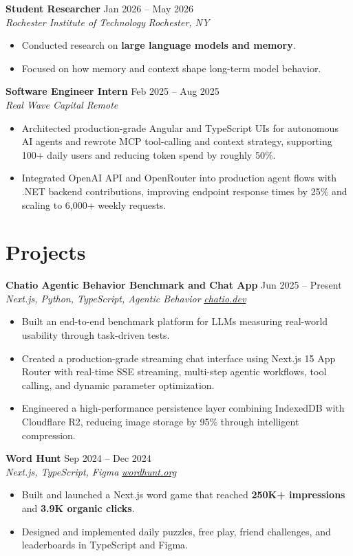 \documentclass[10pt,letterpaper]{article}
\newif\ifresumeFirstRole
\newcommand{\resumeRole}[4]{%
  \ifresumeFirstRole
    \global\resumeFirstRolefalse
  \else
    \vspace{0pt plus 1fill}%
  \fi
  \textbf{#1} \hfill #2\\
  \textit{#3} \hfill \textit{#4}
}
\begin{document}
\resumeRole{Student Researcher}{Jan 2026 -- May 2026}{Rochester Institute of Technology}{Rochester, NY}
\begin{itemize}
  \item Conducted research on \textbf{large language models and memory}.
  \item Focused on how memory and context shape long-term model behavior.
\end{itemize}

\resumeRole{Software Engineer Intern}{Feb 2025 -- Aug 2025}{Real Wave Capital}{Remote}
\begin{itemize}
  \item Architected production-grade Angular and TypeScript UIs for autonomous AI agents and rewrote MCP tool-calling and context strategy, supporting 100+ daily users and reducing token spend by roughly 50\%.
  \item Integrated OpenAI API and OpenRouter into production agent flows with .NET backend contributions, improving endpoint response times by 25\% and scaling to 6,000+ weekly requests.
\end{itemize}

\section*{Projects}
\resumeRole{Chatio Agentic Behavior Benchmark and Chat App}{Jun 2025 -- Present}{Next.js, Python, TypeScript, Agentic Behavior}{\href{https://chatio.dev}{chatio.dev}}
\begin{itemize}
  \item Built an end-to-end benchmark platform for LLMs measuring real-world usability through task-driven tests.
  \item Created a production-grade streaming chat interface using Next.js 15 App Router with real-time SSE streaming, multi-step agentic workflows, tool calling, and dynamic parameter optimization.
  \item Engineered a high-performance persistence layer combining IndexedDB with Cloudflare R2, reducing image storage by 95\% through intelligent compression.
\end{itemize}

\resumeRole{Word Hunt}{Sep 2024 -- Dec 2024}{Next.js, TypeScript, Figma}{\href{https://wordhunt.org}{wordhunt.org}}
\begin{itemize}
  \item Built and launched a Next.js word game that reached \textbf{250K+ impressions} and \textbf{3.9K organic clicks}.
  \item Designed and implemented daily puzzles, free play, friend challenges, and leaderboards in TypeScript and Figma.
\end{itemize}
\end{document}
